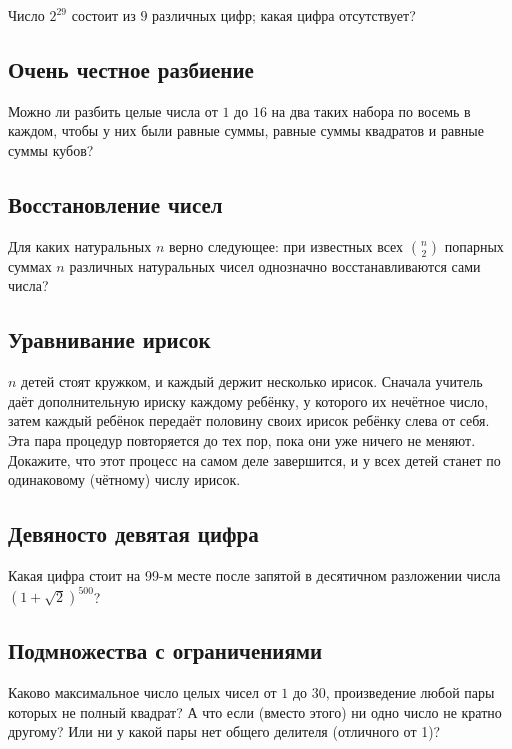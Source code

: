 Число $2^{29}$ состоит из $9$ различных цифр; какая цифра отсутствует?

\subsection*{Очень честное разбиение}

Можно ли разбить целые числа от $1$ до $16$ на два таких набора по восемь в каждом,
чтобы у них были равные суммы, равные суммы квадратов и равные суммы кубов?

\subsection*{Восстановление чисел}

Для каких натуральных $n$ верно следующее: при известных всех $\binom n2$ попарных суммах $n$ различных натуральных чисел однозначно восстанавливаются сами числа?


\subsection*{Уравнивание ирисок}

$n$ детей стоят кружком, и каждый держит несколько ирисок.
Сначала учитель даёт дополнительную ириску каждому ребёнку, у которого их нечётное число,
затем каждый ребёнок передаёт половину своих ирисок ребёнку слева от себя.
Эта пара процедур повторяется до тех пор, пока они уже ничего не меняют.
Докажите, что этот процесс на самом деле завершится, и у всех детей станет по одинаковому (чётному) числу ирисок.

\subsection*{Девяносто девятая цифра}

Какая цифра стоит на 99-м месте после запятой в десятичном разложении числа 
$(1+\sqrt2)^{500}$?

\subsection*{Подмножества с ограничениями}

Каково максимальное число целых чисел от $1$ до $30$, произведение любой пары которых не полный квадрат?
А что если (вместо этого) ни одно число не кратно другому?
Или ни у какой пары нет общего делителя (отличного от 1)?

